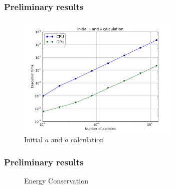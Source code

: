 \begin{frame}
    \frametitle{Preliminary results}
    \begin{figure}
        \centering
        \label{fig:init-time}
        \includegraphics[width=0.7\textwidth]{img/plot-init}
        \caption{Initial $a$ and $\dot{a}$ calculation}
    \end{figure}
\end{frame}

\begin{frame}
    \frametitle{Preliminary results}
    \begin{figure}
        \centering
        \label{fig:init-time}
        \caption{Energy Conservation}
    \end{figure}
\end{frame}


